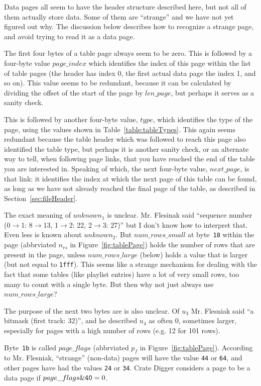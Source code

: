 \documentclass[11pt]{article}
\begin{document}
Data pages all seem to have the header structure described here, but
not all of them actually store data. Some of them are ``strange'' and
we have not yet figured out why. The discussion below describes how to
recognize a strange page, and avoid trying to read it as a data page.

The first four bytes of a table page always seem to be zero. This is
followed by a four-byte value $page\_index$ which identifies the index
of this page within the list of table pages (the header has index 0,
the first actual data page the index 1, and so on). This value seems
to be redundant, because it can be calculated by dividing the offset
of the start of the page by $len\_page$, but perhaps it serves as a
sanity check.

This is followed by another four-byte value, $type$, which identifies
the type of the page, using the values shown in
Table~\ref{table:tableTypes}. This again seems redundant because the
table header which was followed to reach this page also identified the
table type, but perhaps it is another sanity check, or an alternate
way to tell, when following page links, that you have reached the end
of the table you are interested in. Speaking of which, the next
four-byte value, $next\_page$, is that link: it identifies the index
at which the next page of this table can be found, as long as we have
not already reached the final page of the table, as described in
Section~\ref{sec:fileHeader}.

The exact meaning of $unknown_1$ is unclear. Mr. Flesinak said
``sequence number (0$\rightarrow$1: 8$\rightarrow$13, 1$\rightarrow$2:
22, 2$\rightarrow$3: 27)'' but I don't know how to interpret that.
Even less is known about $unknown_2$. But $num\_rows\_small$ at
byte~{\tt 18} within the page (abbrviated $n_{rs}$ in
Figure~\ref{fig:tablePage}) holds the number of rows that are present
in the page, unless $num\_rows\_large$ (below) holds a value that is
larger (but not equal to {\tt 1fff}). This seems like a strange
mechanism for dealing with the fact that some tables (like playlist
entries) have a lot of very small rows, too many to count with a
single byte. But then why not just always use $num\_rows\_large$?

The purpose of the next two bytes are is also unclear. Of $u_3$ Mr.
Flesniak said ``a bitmask (first track: 32)'', and he described $u_4$
as often 0, sometimes larger, especially for pages with a high number
of rows (e.g. 12 for 101 rows).

Byte~{\tt 1b} is called $page\_flags$ (abbrviated $p_f$ in
Figure~\ref{fig:tablePage}). According to Mr. Flesniak, ``strange''
(non-data) pages will have the value {\tt 44} or {\tt 64}, and other
pages have had the values {\tt 24} or {\tt 34}. Crate Digger considers
a page to be a data page if $page\_flags \& {\tt 40} = 0$.
\end{document}
